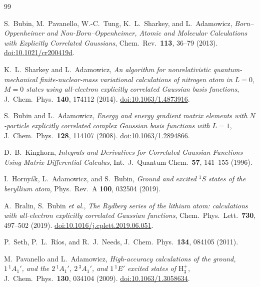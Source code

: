 \documentclass[11pt]{article}
\begin{document}
\begin{thebibliography}{99}

S.\ Bubin, M.\ Pavanello, W.-C.\ Tung, K.\ L.\ Sharkey, and L.\ Adamowicz,
\emph{Born--Oppenheimer and Non-Born--Oppenheimer, Atomic and Molecular
Calculations with Explicitly Correlated Gaussians}, Chem.\ Rev.\ \textbf{113},
36--79 (2013). \href{https://doi.org/10.1021/cr200419d}{doi:10.1021/cr200419d}.

K.\ L.\ Sharkey and L.\ Adamowicz, \emph{An algorithm for nonrelativistic
quantum-mechanical finite-nuclear-mass variational calculations of nitrogen
atom in $L=0$, $M=0$ states using all-electron explicitly correlated Gaussian
basis functions}, J.\ Chem.\ Phys.\ \textbf{140}, 174112 (2014).
\href{https://doi.org/10.1063/1.4873916}{doi:10.1063/1.4873916}.

S.\ Bubin and L.\ Adamowicz, \emph{Energy and energy gradient matrix elements
with $N$-particle explicitly correlated complex Gaussian basis functions with
$L=1$}, J.\ Chem.\ Phys.\ \textbf{128}, 114107 (2008).
\href{https://doi.org/10.1063/1.2894866}{doi:10.1063/1.2894866}.

D.\ B.\ Kinghorn, \emph{Integrals and Derivatives for Correlated Gaussian
Functions Using Matrix Differential Calculus}, Int.\ J.\ Quantum Chem.\
\textbf{57}, 141--155 (1996).

I.\ Horny\'ak, L.\ Adamowicz, and S.\ Bubin, \emph{Ground and excited $^1S$
states of the beryllium atom}, Phys.\ Rev.\ A \textbf{100}, 032504 (2019).

A.\ Bralin, S.\ Bubin \emph{et al.}, \emph{The Rydberg series of the lithium
atom: calculations with all-electron explicitly correlated Gaussian functions},
Chem.\ Phys.\ Lett.\ \textbf{730}, 497--502 (2019).
\href{https://doi.org/10.1016/j.cplett.2019.06.051}{doi:10.1016/j.cplett.2019.06.051}.

P.\ Seth, P.\ L.\ R\'ios, and R.\ J.\ Needs, J.\ Chem.\ Phys.\ \textbf{134},
084105 (2011).

M.\ Pavanello and L.\ Adamowicz, \emph{High-accuracy calculations of the
ground, $1\,{}^1A_1'$, and the $2\,{}^1A_1'$, $2\,{}^3A_1'$, and $1\,{}^1E'$
excited states of $\mathrm{H_3^+}$}, J.\ Chem.\ Phys.\ \textbf{130}, 034104
(2009). \href{https://doi.org/10.1063/1.3058634}{doi:10.1063/1.3058634}.


\end{thebibliography}
\end{document}
